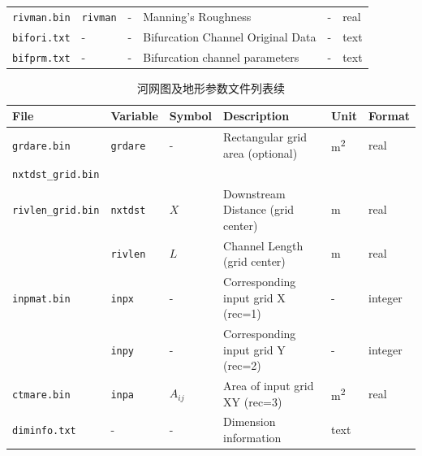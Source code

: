 \begin{table}[htbp]
\begin{tabular}[h]{p{3.5cm}p{1.5cm}p{1.5cm}p{5cm}p{1cm}p{1cm}}
    \texttt{rivman.bin}        & \texttt{rivman} & -      & Manning’s Roughness                          & -         & real    \\
    \texttt{bifori.txt}        & -               & -      & Bifurcation Channel Original Data            & -         & text    \\
    \texttt{bifprm.txt}        & -               & -      & Bifurcation channel parameters               & -         & text    \\ \bottomrule
  \end{tabular}
\end{table}


\begin{table}[htbp]
  \centering
  \caption{河网图及地形参数文件列表续}
  \label{tab:河网图及地形参数文件列表2}
  \begin{tabular}[h]{p{3.5cm}p{1.5cm}p{1.5cm}p{5cm}p{1cm}p{1cm}} %
    \toprule
    File                      & Variable        & Symbol   & Description                                          & Unit            & Format  \\ \midrule
    \texttt{grdare.bin}       & \texttt{grdare} & -        & Rectangular grid area (optional)                     & \unit{m^2}      & real    \\
    \texttt{nxtdst\_grid.bin} &                 &          &                                                      &                 &         \\
    \texttt{rivlen\_grid.bin} & \texttt{nxtdst} & $X$      & Downstream Distance (grid center)                    & m               & real    \\
                              & \texttt{rivlen} & $L$      & Channel Length (grid center)                         & m               & real    \\
    \texttt{inpmat.bin}       & \texttt{inpx}   & -        & Corresponding input grid X (rec=1)                   & -               & integer \\
                              & \texttt{inpy}   & -        & Corresponding input grid Y (rec=2)                   & -               & integer \\
    \texttt{ctmare.bin}       & \texttt{inpa}   & $A_{ij}$ & Area of input grid XY (rec=3)                        & \unit{m^2}      & real    \\
    \texttt{diminfo.txt}      & -               & -        & Dimension information                                & text            &         \\

\end{tabular}
\end{table}
